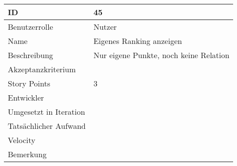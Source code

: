 \begin{tabularx}{\textwidth}{|p{}|X|}
	\hline
	ID & 45\\
	\hline
	Benutzerrolle & Nutzer\\
	\hline
	Name & Eigenes Ranking anzeigen\\
	\hline
	Beschreibung & Nur eigene Punkte, noch keine Relation\\
	\hline
	Akzeptanzkriterium & \\
	\hline
	Story Points & 3\\
	\hline
	Entwickler & \\
	\hline
	Umgesetzt in Iteration & \\ 
	\hline
	Tatsächlicher Aufwand & \\
	\hline
	Velocity & \\
	\hline
	Bemerkung & \\
	\hline
\end{tabularx}
\vspace{20pt}
